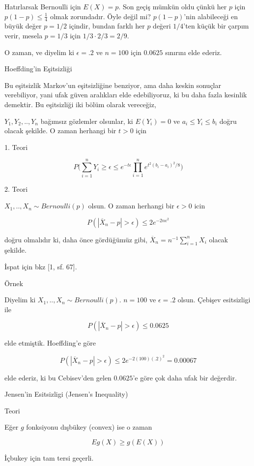 \documentclass[12pt,fleqn]{article}\usepackage{../../common}
\begin{document}
Hatırlarsak Bernoulli için $E(X)=p$. Son geçiş mümkün oldu çünkü her $p$
için $p(1-p) \le \frac{1}{4}$ olmak zorundadır. Öyle değil mi? $p(1-p)$'nin
alabileceği en büyük değer $p=1/2$ içindir, bundan farklı her $p$ değeri
$1/4$'ten küçük bir çarpım verir, mesela $p=1/3$ için
$1/3 \cdot 2/3 = 2/9$.

O zaman, ve diyelim ki $\epsilon = .2$ ve $n=100$ için $0.0625$ sınırını
elde ederiz. 

Hoeffding'in Eşitsizliği

Bu eşitsizlik Markov'un eşitsizliğine benziyor, ama daha keskin sonuçlar
verebiliyor, yani ufak güven aralıkları elde edebiliyoruz, ki bu daha fazla
kesinlik demektir. Bu eşitsizliği iki bölüm olarak vereceğiz, 

$Y_1,Y_2,..,Y_n$ bağımsız gözlemler olsunlar, ki $E(Y_i)=0$ ve
$a_i \le Y_i \le b_i$ doğru olacak şekilde. O zaman herhangi bir $t>0$ için 

1. Teori

$$ 
P \bigg( 
\sum_{i=1}^{n} Y_i \ge \epsilon \le e^{-t\epsilon} 
\prod_{i=1}^{n} e^{{t^2}(b_i-a_i)^2 / 8}
\bigg)
$$

2. Teori

$X_1,..,X_n \sim Bernoulli(p)$ olsun. O zaman herhangi bir $\epsilon > 0$ icin

$$ P(|\overline{X}_n -p| > \epsilon ) \le 2e^{-2n\epsilon^2}$$

doğru olmalıdır ki, daha önce gördüğümüz gibi,
$\overline{X}_n = n^{-1}\sum_{i=1}^{n} X_i$ olacak şekilde. 

İspat için bkz [1, sf. 67]. 

Örnek

Diyelim ki $X_1,..,X_n \sim Bernoulli(p)$. $n=100$ ve $\epsilon=.2$
olsun. Çebişev esitsizligi ile 

$$ P(|\overline{X}_n - p| > \epsilon ) \le 0.0625 $$

elde etmiştik. Hoeffding'e göre

$$ 
P(|\overline{X}_n - p| > \epsilon ) \le 2e^{-2 (100)(.2)^2} = 0.00067
$$

elde ederiz, ki bu Cebisev'den gelen $0.0625$'e göre çok daha ufak bir
değerdir.

Jensen'in Esitsizligi (Jensen's Inequality)

Teori

Eğer $g$ fonksiyonu dışbükey (convex) ise o zaman

$$
E g(X) \ge g(E(X)) 
$$

İçbukey için tam tersi geçerli.
\end{document}
